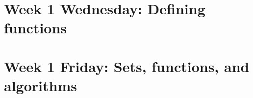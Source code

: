 \section*{Week 1 Wednesday: Defining functions}





\section*{Week 1 Friday: Sets, functions, and algorithms}

\newpage


